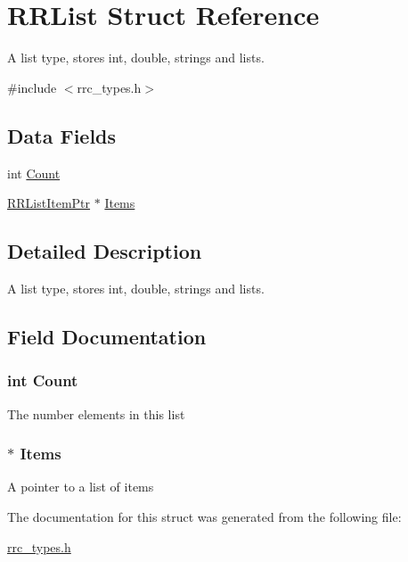 \hypertarget{struct_r_r_list}{\section{R\+R\+List Struct Reference}
\label{struct_r_r_list}
}


A list type, stores int, double, strings and lists.  




{\ttfamily \#include $<$rrc\+\_\+types.\+h$>$}

\subsection*{Data Fields}
\begin{DoxyCompactItemize}
\item 
int \hyperlink{struct_r_r_list_aad462966ed963f892117056de1eba502}{Count}
\item 
\hyperlink{rrc__types_8h_a79938364b69256c42480bb3a29ebf73e}{R\+R\+List\+Item\+Ptr} $\ast$ \hyperlink{struct_r_r_list_ada0586e0d2f92ef7b364486c9e989fcf}{Items}
\end{DoxyCompactItemize}


\subsection{Detailed Description}
A list type, stores int, double, strings and lists. 

\subsection{Field Documentation}
\hypertarget{struct_r_r_list_aad462966ed963f892117056de1eba502}{
\subsubsection[{Count}]{\setlength{\rightskip}{0pt plus 5cm}int Count}}\label{struct_r_r_list_aad462966ed963f892117056de1eba502}
The number elements in this list \hypertarget{struct_r_r_list_ada0586e0d2f92ef7b364486c9e989fcf}{
\subsubsection[{Items}]{$\ast$ Items}}\label{struct_r_r_list_ada0586e0d2f92ef7b364486c9e989fcf}
A pointer to a list of items 

The documentation for this struct was generated from the following file\+:\begin{DoxyCompactItemize}
\item 
\hyperlink{rrc__types_8h}{rrc\+\_\+types.\+h}\end{DoxyCompactItemize}
